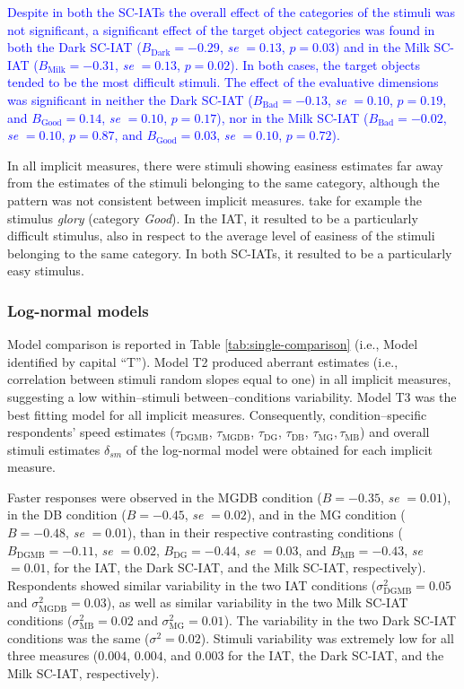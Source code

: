 \documentclass[12pt]{book}
\begin{document}
\textcolor{blue}{Despite in both the SC-IATs the overall effect of the categories of the stimuli was not significant, a significant effect of the target object categories was found in both the Dark SC-IAT ($B_{\text{Dark}} = -0.29$, \emph{se}  $= 0.13$, $p =  0.03$) and in the Milk SC-IAT ($B_{\text{Milk}} = -0.31$, \emph{se}  $= 0.13$, $p = 0.02$). In both cases, the target objects tended to be the most difficult stimuli. 
	The effect of the evaluative dimensions was significant in neither the Dark SC-IAT ($B_{\text{Bad}} = -0.13$, \emph{se}  $=0.10$, $p = 0.19$, and $B_{\text{Good}} = 0.14$, \emph{se}  $= 0.10$, $p = 0.17$), nor in the Milk SC-IAT ($B_{\text{Bad}} = -0.02$, \emph{se}  $=0.10$, $p = 0.87$, and $B_{\text{Good}} = 0.03$, \emph{se}  $=0.10$, $p =0.72$).}

In all implicit measures, there were stimuli showing easiness estimates far away from the estimates of the stimuli belonging to the same category, although the pattern was not consistent between implicit measures.
take for example the stimulus \emph{glory} (category \emph{Good}). 
In the IAT, it resulted to be a particularly difficult stimulus, also in respect to the average level of
easiness of the stimuli belonging to the same category. 
In both SC-IATs, it resulted to be a particularly easy stimulus.

\subsubsection{Log-normal models}

Model comparison is reported in Table \ref{tab:single-comparison} (i.e., Model identified by capital ``T''). 
Model T2 produced aberrant estimates (i.e., correlation between stimuli random slopes equal to one) in all implicit measures, suggesting a low within--stimuli between--conditions variability. 
Model T3 was the best fitting model for all implicit measures. 
Consequently, condition--specific respondents' speed estimates ($\tau_{\text{DGMB}}$, $\tau_{\text{MGDB}}$, $\tau_{\text{DG}}$, $\tau_{\text{DB}}$, $\tau_{\text{MG}}, $$\tau_{\text{MB}}$) and overall stimuli estimates $\delta_{sm}$ of the log-normal model were obtained for each implicit measure. 

Faster responses were observed in the MGDB condition ($B = -0.35$, \emph{se} $= 0.01$), in the DB condition ($B = -0.45$, \emph{se}  $= 0.02$), and in the MG condition ($B = -0.48$, \emph{se}  $= 0.01$), than in their respective contrasting conditions ($B_{\text{DGMB}} = -0.11$, \emph{se}   $= 0.02$, $B_{\text{DG}} = -0.44$, \emph{se}  $= 0.03$, and $B_{\text{MB}} = -0.43$, \emph{se}  $= 0.01$, for the IAT, the Dark SC-IAT, and the Milk SC-IAT, respectively).
Respondents showed similar variability in the two IAT conditions ($\sigma_{\text{DGMB}}^2 = 0.05$ and $\sigma_{\text{MGDB}}^2 = 0.03$), as well as similar variability in the two Milk SC-IAT conditions ($\sigma_{\text{MB}}^2 =0.02$ and $\sigma_{\text{MG}}^2 =0.01$). The variability in the two Dark SC-IAT conditions was the same ($\sigma^2 =0.02$). Stimuli variability was extremely low for all three measures ($0.004$, $0.004$, and $0.003$ for the IAT, the Dark SC-IAT, and the Milk SC-IAT, respectively).
\end{document}
